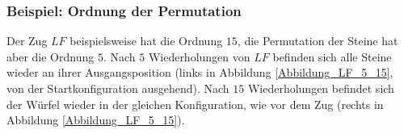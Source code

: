 \documentclass[12pt,a4paper, usenames, dvipsnames]{article}
\theoremstyle{mystyle}
\theoremstyle{definition}
\newcommand{\Ttwo}{2$\times$2$\times$2-}
\begin{document}

\subsubsection*{Beispiel: Ordnung der Permutation}

Der Zug $LF$ beispielsweise hat die Ordnung $15$, die Permutation der Steine hat aber die Ordnung $5$. Nach $5$ Wiederholungen von $LF$ befinden sich alle Steine wieder an ihrer Ausgangsposition (links in Abbildung \ref{Abbildung_LF_5_15}, von der Startkonfiguration ausgehend). Nach $15$ Wiederholungen befindet sich der Würfel wieder in der gleichen Konfiguration, wie vor dem Zug (rechts in Abbildung \ref{Abbildung_LF_5_15}).
\end{document}

